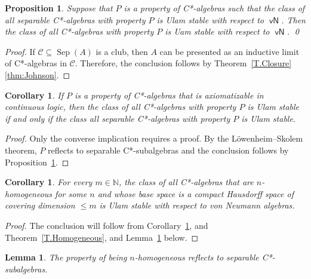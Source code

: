 \documentclass[11pt]{amsproc}
\newcommand{\bbN}{\mathbb N}
\DeclareMathOperator{\Sep}{Sep}
\newcommand{\cstar}{C*}
\DeclareMathOperator{\sfvN}{\mathsf {vN}}
\newcommand{\cC}{\mathcal C}
\theoremstyle{definition}
\theoremstyle{plain}
\newtheorem{lemma}[definition]{Lemma}
\newtheorem{proposition}[definition]{Proposition}
\newtheorem{corollary}[definition]{Corollary}
\theoremstyle{remark}
\begin{document}
\begin{proposition} \label{P.Reflection} Suppose that $P$ is a property of \cstar-algebras such that the class of all separable \cstar-algebras with property $P$ is Ulam stable with respect to $\sfvN$. Then the class of all \cstar-algebras with property $P$ is Uam stable with respect to $\sfvN$. \qed 
\end{proposition}
\begin{proof}
	If $\cC\subseteq \Sep(A)$ is a club, then $A$ can be presented as an inductive limit of \cstar-algebras in $\cC$. Therefore, the conclusion follows by  Theorem~\ref{T.Closure} \eqref{thm:Johnson}. 
\end{proof}

\begin{corollary}\label{C.AxiomatizableReflects}
	If $P$ is a property of \cstar-algebras that is axiomatizable in continuous logic, then the class of all \cstar-algebras with property $P$ is Ulam stable if and only if the class all separable \cstar-algebras with property $P$ is Ulam stable. 
\end{corollary}

\begin{proof}
	Only the converse implication requires a proof. By the L\"owenheim--Skolem theorem, $P$ reflects to separable \cstar-subalgebras and the conclusion follows by Proposition~\ref{P.Reflection}. 
\end{proof}

\begin{corollary}\label{C.Nonseparable}
	For every $m\in \bbN$, the class of all \cstar-algebras that are $n$-homogeneous for some $n$ and whose base space is a compact Hausdorff space of covering dimension $\leq m$ is Ulam stable with respect to von Neumann algebras. 
\end{corollary}

\begin{proof}
	The conclusion will follow from Corollary~\ref{C.AxiomatizableReflects},  and 
	Theorem~\ref{T.Homogeneous}, and Lemma~\ref{L.HomogeneousReflects} below. 
\end{proof}

\begin{lemma}
	\label{L.HomogeneousReflects}
The property of being $n$-homogeneous reflects to separable \cstar-subalgebras. 
\end{lemma}
\end{document}
